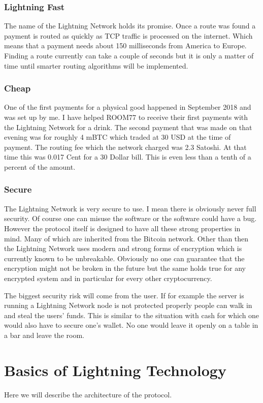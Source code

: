 \documentclass[a4paper,12pt,oneside,openany]{book}
\begin{document}
\subsection{Lightning Fast}
The name of the Lightning Network holds its promise.
Once a route was found a payment is routed as quickly as TCP traffic is processed on the internet.
Which means that a payment needs about 150 milliseconds from America to Europe.
Finding a route currently can take a couple of seconds but it is only a matter of time until smarter routing algorithms will be implemented.


\subsection{Cheap}
One of the first payments for a physical good happened in September 2018 and was set up by me. 
I have helped ROOM77 to receive their first payments with the Lightning Network for a drink.
The second payment that was made on that evening was for roughly 4 mBTC which traded at 30 USD at the time of payment.
The routing fee which the network charged was 2.3 Satoshi.
At that time this was 0.017 Cent for a 30 Dollar bill. 
This is even less than a tenth of a percent of the amount.


\subsection{Secure}
The Lightning Network is very secure to use.
I mean there is obviously never full security.
Of course one can misuse the software or the software could have a bug.
However the protocol itself is designed to have all these strong properties in mind.
Many of which are inherited from the Bitcoin network.
Other than then the Lightning Network uses modern and strong forms of encryption which is currently known to be unbreakable.
Obviously no one can guarantee that the encryption might not be broken in the future but the same holds true for any encrypted system and in particular for every other cryptocurrency.

The biggest security risk will come from the user.
If for example the server is running a Lightning Network node is not protected properly people can walk in and steal the users' funds.
This is similar to the situation with cash for which one would also have to secure one's wallet.
No one would leave it openly on a table in a bar and leave the room.

\chapter{Basics of Lightning Technology}
Here we will describe the architecture of the protocol.
\end{document}
